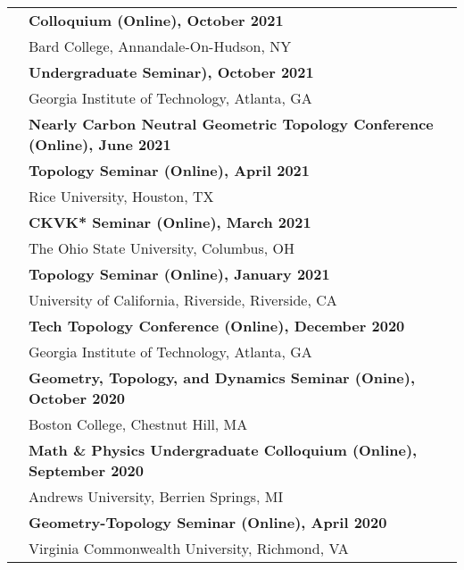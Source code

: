\documentclass[letterpaper,11pt,oneside]{article}
\begin{document}
\begin{tabular}{@{} l l l}
    &  \textbf{Colloquium (Online), October 2021}\\
    & Bard College, Annandale-On-Hudson, NY \\
     &  \textbf{Undergraduate Seminar), October 2021}\\
    &  Georgia Institute of Technology, Atlanta, GA \\
  & \textbf{Nearly Carbon Neutral Geometric Topology Conference (Online), June 2021}\\
            & \textbf{Topology Seminar (Online), April 2021} \\
     & Rice University, Houston, TX\\
          & \textbf{CKVK* Seminar (Online), March 2021} \\
     & The Ohio State University, Columbus, OH\\
            & \textbf{Topology Seminar (Online), January 2021} \\
     & University of California, Riverside, Riverside, CA\\
            & \textbf{Tech Topology Conference (Online), December 2020} \\
     & Georgia Institute of Technology, Atlanta, GA\\

     & \textbf{Geometry, Topology, and Dynamics Seminar (Onine), October 2020} \\
     & Boston College, Chestnut Hill, MA\\
     
          & \textbf{Math \& Physics Undergraduate Colloquium (Online), September  2020} \\
     & Andrews University, Berrien Springs, MI\\
       
     
          & \textbf{Geometry-Topology Seminar (Online), April 2020} \\
     & Virginia Commonwealth University, Richmond, VA\\
     
%     
                  

\end{tabular}
\end{document}
